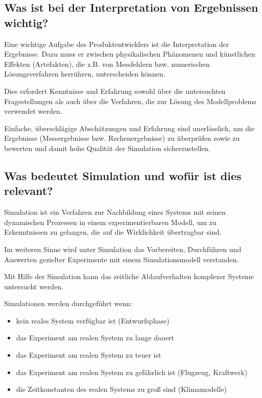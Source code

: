 \subsection{Was ist bei der Interpretation von Ergebnissen wichtig?}
Eine wichtige Aufgabe des Produktentwicklers ist die 
Interpretation der Ergebnisse. Dazu muss er zwischen physikalischen Phänomenen und künstlichen Effekten 
(Artefakten), die z.B. von Messfehlern bzw. numerischen Lösungsverfahren herrühren, unterscheiden können. 

Dies erfordert Kenntnisse und Erfahrung sowohl über die untersuchten Fragestellungen als auch über die Verfahren, die zur Lösung des Modellproblems verwendet werden. 

Einfache, überschlägige Abschätzungen und Erfahrung sind unerlässlich, um die Ergebnisse (Messergebnisse bzw. Rechenergebnisse) 
zu überprüfen sowie zu bewerten und damit hohe Qualität der Simulation sicherzustellen.

\subsection{Was bedeutet Simulation und wofür ist dies relevant?}

Simulation ist ein Verfahren zur Nachbildung eines Systems mit seinen 
dynamischen Prozessen in einem experimentierbaren Modell, um zu 
Erkenntnissen zu gelangen, die auf die Wirklichkeit übertragbar sind. 

Im weiteren Sinne wird unter Simulation das Vorbereiten, Durchführen und 
Auswerten gezielter Experimente mit einem Simulationsmodell verstanden. 

Mit Hilfe der Simulation kann das zeitliche Ablaufverhalten komplexer Systeme 
untersucht werden.    

Simulationen werden durchgeführt wenn:
\begin{itemize}
    \item kein reales System verfügbar ist (Entwurfsphase)
    \item das Experiment am realen System zu lange dauert
    \item das Experiment am realen System zu teuer ist
    \item das Experiment am realen System zu gefährlich ist (Flugzeug, Kraftwerk)
    \item die Zeitkonstanten des realen Systems zu groß sind (Klimamodelle)
\end{itemize}